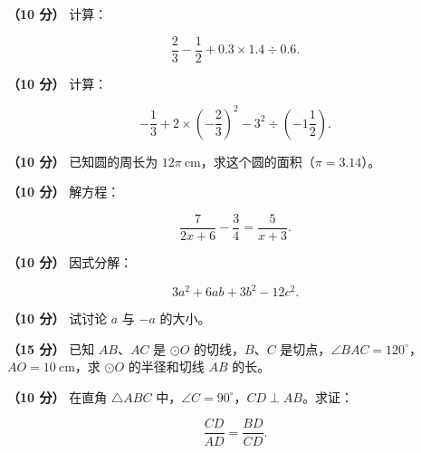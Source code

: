\begin{question}
\textbf{（10 分）} 计算：

\nopagebreak[4]
\[
\frac23-\frac12+0.3\times1.4\div0.6.
\]

\end{question}
\begin{question}
\textbf{（10 分）} 计算：

\nopagebreak[4]
\[
-\frac13+2\times\left(-\frac23\right)^2-3^2\div\left(-1\frac12\right).
\]

\end{question}
\begin{question}
\textbf{（10 分）} 已知圆的周长为 $12\pi\ \mathrm{cm}$，求这个圆的面积（$\pi=3.14$）。

\end{question}
\begin{question}
\textbf{（10 分）} 解方程：

\nopagebreak[4]
\[
\frac{7}{2x+6}-\frac34=\frac{5}{x+3}.
\]

\end{question}
\begin{question}
\textbf{（10 分）} 因式分解：

\nopagebreak[4]
\[
3a^2+6ab+3b^2-12c^2.
\]

\end{question}
\begin{question}
\textbf{（10 分）} 试讨论 $a$ 与 $-a$ 的大小。

\Needspace{0.4\textheight}
\end{question}
\begin{question}
\textbf{（15 分）} 已知 $AB\text{、}AC$ 是 $\odot O$ 的切线，$B\text{、}C$ 是切点，$\angle BAC=120^\circ$，$AO=10\ \mathrm{cm}$，求 $\odot O$ 的半径和切线 $AB$ 的长。
\nopagebreak[4]
\begin{center}\end{center}
\nopagebreak[4]
\Needspace{0.4\textheight}
\end{question}
\begin{question}
\textbf{（10 分）} 在直角 $\triangle ABC$ 中，$\angle C=90^\circ$，$CD\perp AB$。求证：

\nopagebreak[4]
\[
\frac{CD}{AD}=\frac{BD}{CD}.
\]
\nopagebreak[4]
\begin{center}\end{center}
\nopagebreak[4]
\end{question}
